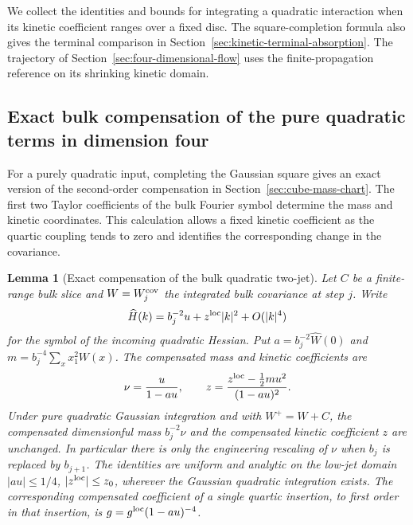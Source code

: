 \documentclass[11pt]{article}
\newtheorem{lemma}[theorem]{Lemma}
\theoremstyle{definition}
\begin{document}
We collect the identities and bounds for integrating a quadratic
interaction when its kinetic coefficient ranges over a fixed disc.
The square-completion formula also gives the terminal comparison in
Section~\ref{sec:kinetic-terminal-absorption}. The trajectory of
Section~\ref{sec:four-dimensional-flow} uses the finite-propagation
reference on its shrinking kinetic domain.

\subsection{Exact bulk compensation of the pure quadratic terms in dimension four}
\label{sec:kinetic-exact-compensation}

For a purely quadratic input, completing the Gaussian square gives
an exact version of the second-order compensation in
Section~\ref{sec:cube-mass-chart}. The first two Taylor coefficients
of the bulk Fourier symbol determine the mass and kinetic
coordinates. This calculation allows a fixed kinetic coefficient as
the quartic coupling tends to zero and identifies the corresponding
change in the covariance.

\begin{lemma}[Exact compensation of the bulk quadratic two-jet]
\label{lem:kinetic-exact-compensation}
Let \(C\) be a finite-range bulk slice and \(W=W_j^{\rm cov}\)
the integrated bulk covariance at step \(j\). Write
\begin{equation}
 \widehat H(k)=b_j^{-2}u+z^{\rm loc}|k|^2+O(|k|^4)
\end{equation}
for the symbol of the incoming quadratic Hessian. Put
\(a=b_j^{-2}\widehat W(0)\) and
\(m=b_j^{-4}\sum_x x_1^2 W(x)\). The compensated mass and
kinetic coefficients are
\begin{equation}
 \nu=\frac{u}{1-au},\qquad
 z=\frac{z^{\rm loc}-\tfrac12 m u^2}{(1-au)^2}.
 \label{eq:kinetic-rational-compensation}
\end{equation}
Under pure quadratic Gaussian integration and with
\(W^+=W+C\), the compensated dimensionful mass
\(b_j^{-2}\nu\) and the compensated kinetic coefficient \(z\)
are unchanged. In particular there is only the engineering
rescaling of \(\nu\) when \(b_j\) is replaced by \(b_{j+1}\).
The identities are uniform and analytic on the low-jet domain
\(|a u|\le 1/4\), \(|z^{\rm loc}|\le z_0\), wherever the
Gaussian quadratic integration exists. The corresponding
compensated coefficient of a single quartic insertion,
to first order in that insertion, is
\(g=g^{\rm loc}(1-au)^{-4}\).
\end{lemma}
\end{document}
